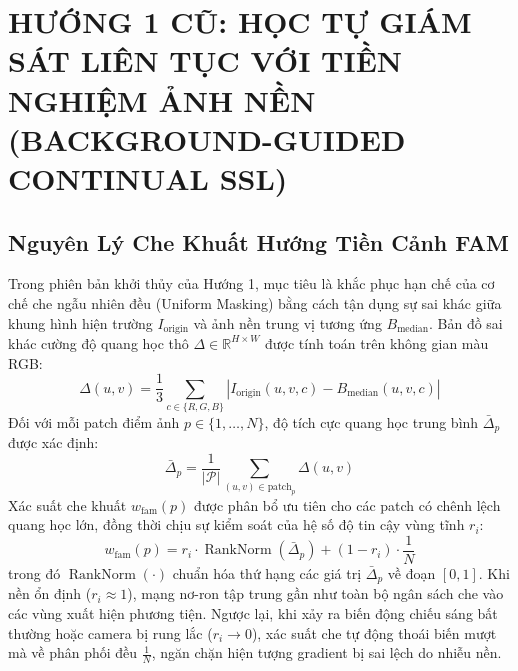 \documentclass[11pt,a4paper]{article}
\begin{document}
\section{HƯỚNG 1 CŨ: HỌC TỰ GIÁM SÁT LIÊN TỤC VỚI TIỀN NGHIỆM ẢNH NỀN (BACKGROUND-GUIDED CONTINUAL SSL)}

\subsection{Nguyên Lý Che Khuất Hướng Tiền Cảnh FAM}
Trong phiên bản khởi thủy của Hướng 1, mục tiêu là khắc phục hạn chế của cơ chế che ngẫu nhiên đều (Uniform Masking) bằng cách tận dụng sự sai khác giữa khung hình hiện trường $I_{\text{origin}}$ và ảnh nền trung vị tương ứng $B_{\text{median}}$.
Bản đồ sai khác cường độ quang học thô $\Delta \in \mathbb{R}^{H \times W}$ được tính toán trên không gian màu RGB:
\begin{equation}
    \Delta(u, v) = \frac{1}{3} \sum_{c \in \{R, G, B\}} |I_{\text{origin}}(u, v, c) - B_{\text{median}}(u, v, c)|
\end{equation}
Đối với mỗi patch điểm ảnh $p \in \{1, \dots, N\}$, độ tích cực quang học trung bình $\bar{\Delta}_p$ được xác định:
\begin{equation}
    \bar{\Delta}_p = \frac{1}{|\mathcal{P}|} \sum_{(u, v) \in \text{patch}_p} \Delta(u, v)
\end{equation}
Xác suất che khuất $w_{\text{fam}}(p)$ được phân bổ ưu tiên cho các patch có chênh lệch quang học lớn, đồng thời chịu sự kiểm soát của hệ số độ tin cậy vùng tĩnh $r_i$:
\begin{equation}
    w_{\text{fam}}(p) = r_i \cdot \operatorname{RankNorm}(\bar{\Delta}_p) + (1 - r_i) \cdot \frac{1}{N}
\end{equation}
trong đó $\operatorname{RankNorm}(\cdot)$ chuẩn hóa thứ hạng các giá trị $\bar{\Delta}_p$ về đoạn $[0, 1]$. Khi nền ổn định ($r_i \approx 1$), mạng nơ-ron tập trung gần như toàn bộ ngân sách che vào các vùng xuất hiện phương tiện. Ngược lại, khi xảy ra biến động chiếu sáng bất thường hoặc camera bị rung lắc ($r_i \to 0$), xác suất che tự động thoái biến mượt mà về phân phối đều $\frac{1}{N}$, ngăn chặn hiện tượng gradient bị sai lệch do nhiễu nền.
\end{document}
